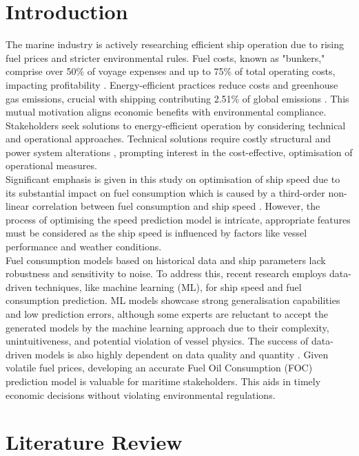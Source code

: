 \documentclass[]{interact}
\theoremstyle{plain}%
\theoremstyle{definition}
\theoremstyle{remark}
\begin{document}
\section{Introduction}

The marine industry is actively researching efficient ship operation due to rising fuel prices and stricter environmental rules. Fuel costs, known as "bunkers," comprise over 50\% of voyage expenses and up to 75\% of total operating costs, impacting profitability \citep{Bialystocki.2016}. Energy-efficient practices reduce costs and greenhouse gas emissions, crucial with shipping contributing 2.51\% of global emissions \citep{IMO.2020}. This mutual motivation aligns economic benefits with environmental compliance. Stakeholders seek solutions to energy-efficient operation by considering technical and operational approaches. Technical solutions require costly structural and power system alterations \citep{Yan.2021,Li.2022}, prompting interest in the cost-effective, optimisation of operational measures.\\

Significant emphasis is given in this study on optimisation of ship speed due to its substantial impact on fuel consumption which is caused by a third-order non-linear correlation between fuel consumption and ship speed \citep{Wang.2012,Du.2019}. However, the process of optimising the speed prediction model is intricate, appropriate features must be considered as the ship speed is influenced by factors like vessel performance and weather conditions.\\

Fuel consumption models based on historical data and ship parameters lack robustness and sensitivity to noise. To address this, recent research employs data-driven techniques, like machine learning (ML), for ship speed and fuel consumption prediction. ML models showcase strong generalisation capabilities and low prediction errors, although some experts are reluctant to accept the generated models by the machine learning approach due to their complexity, unintuitiveness, and potential violation of vessel physics. The success of data-driven models is also highly dependent on data quality and quantity \citep{Yan.2021,Gkerekos.2019}. Given volatile fuel prices, developing an accurate Fuel Oil Consumption (FOC) prediction model is valuable for maritime stakeholders. This aids in timely economic decisions without violating environmental regulations.\\


\section{Literature Review}\label{sec:literature_review}
\end{document}
